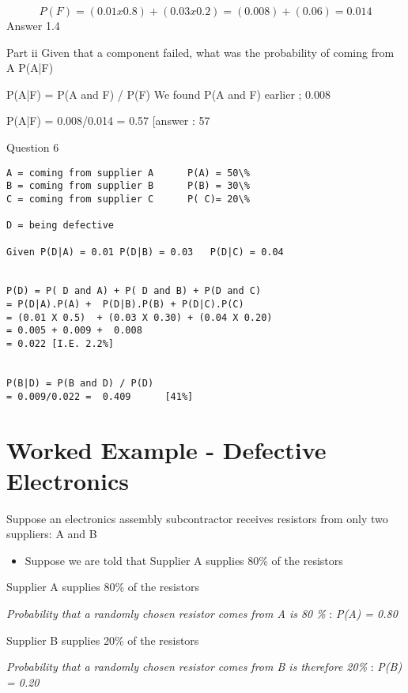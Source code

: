 \documentclass[]{report}
\begin{document}
\[P(F)  =  ( 0.01 x 0.8 ) + ( 0.03 x 0.2) = (0.008) + (0.06) = 0.014	\]
	Answer 1.4%

Part ii
Given that a component failed, what was the probability of coming from A
P(A|F) 

P(A|F) = P(A and F)  / P(F)		We found P(A and F) earlier ; 0.008

P(A|F) = 0.008/0.014 =  0.57			[answer : 57%
















Question 6

\begin{verbatim}
A = coming from supplier A		P(A) = 50\%
B = coming from supplier B		P(B) = 30\%	
C = coming from supplier C		P( C)= 20\%

D = being defective

Given P(D|A) = 0.01	P(D|B) = 0.03	P(D|C) = 0.04


P(D) = P( D and A) + P( D and B) + P(D and C)
= P(D|A).P(A) +  P(D|B).P(B) + P(D|C).P(C)
= (0.01 X 0.5)  + (0.03 X 0.30) + (0.04 X 0.20)
= 0.005 + 0.009 +  0.008
= 0.022 [I.E. 2.2%]


P(B|D) = P(B and D) / P(D)  
= 0.009/0.022 =  0.409		[41%]
\end{verbatim}





\section{Worked Example  - Defective Electronics}		
Suppose an electronics assembly subcontractor receives resistors from only two suppliers: A and B

\begin{itemize}
	\item Suppose we are told that Supplier A supplies 80\% of the resistors
	
	
	
\end{itemize}

\begin{framed}			
	\begin{itemize}
		\item Supplier A supplies 80\% of the resistors
		{
			
			
			\item \textit{Probability that a randomly chosen resistor comes from A is 80 \%} : \textit{P(A) = 0.80 }
			
		}
		\item Supplier B supplies 20\% of the resistors
		\item \textit{Probability that a randomly chosen resistor comes from B is therefore 20\%} : \textit{P(B) = 0.20}
	\end{itemize}
\end{framed}	
\end{document}
